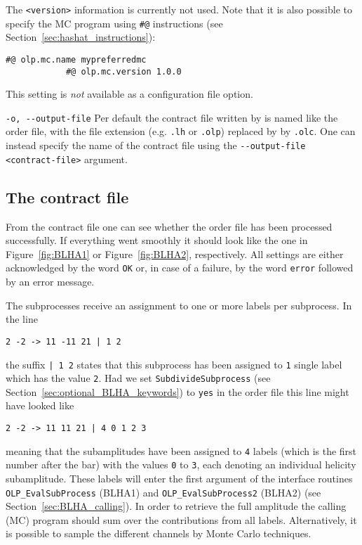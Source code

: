 \begin{basedescript}{\desclabelstyle{\pushlabel}}
      The \lstinline[style=sh]|<version>| information is currently not used. Note that it is also possible to specify the MC program using \texttt{\#@} instructions (see Section~\ref{sec:hashat_instructions}):
      \begin{lstlisting}[style=in]
            #@ olp.mc.name mypreferredmc
            #@ olp.mc.version 1.0.0
      \end{lstlisting}
      This setting is \emph{not} available as a configuration file option.
%
      \item[\hspace{-1em}]\colorbox{gray!30}{\lstinline[style=sh]|-o, --output-file|} Per default the contract file written by \gosam is named like the order file, with the file extension (e.g. \texttt{.lh} or \texttt{.olp}) replaced by by \texttt{.olc}. One can instead specify the name of the contract file using the \lstinline[style=sh]|--output-file <contract-file>| argument.
\end{basedescript}

%
%
%

\subsection{The contract file}
From the contract file one can see whether the order file has been processed successfully. If everything went smoothly it should look like the one in Figure~\ref{fig:BLHA1} or Figure~\ref{fig:BLHA2}, respectively. All settings are either acknowledged by the word \texttt{OK} or, in case of a failure, by the word \texttt{error} followed by an error message.

The subprocesses receive an assignment to one or more labels per subprocess. In the line
\begin{lstlisting}[style=in]
2 -2 -> 11 -11 21 | 1 2
\end{lstlisting}
the suffix \texttt{| 1 2} states that this subprocess has been assigned to \texttt{1} single label which has the value \texttt{2}. Had we set \texttt{SubdivideSubprocess} (see Section~\ref{sec:optional_BLHA_keywords}) to \texttt{yes} in the order file this line might have looked like
\begin{lstlisting}[style=in]
2 -2 -> 11 11 21 | 4 0 1 2 3
\end{lstlisting}
meaning that the subamplitudes have been assigned to \texttt{4} labels (which is the first number after the bar) with the values \texttt{0} to \texttt{3}, each denoting an individual helicity subamplitude. These labels will enter the first argument of the interface routines \texttt{OLP\_EvalSubProcess} (BLHA1) and \texttt{OLP\_EvalSubProcess2} (BLHA2) (see Section~\ref{sec:BLHA_calling}). In order to retrieve the full amplitude the calling (MC) program should sum over the contributions from all labels. Alternatively, it is possible to sample the different channels by Monte Carlo techniques.

